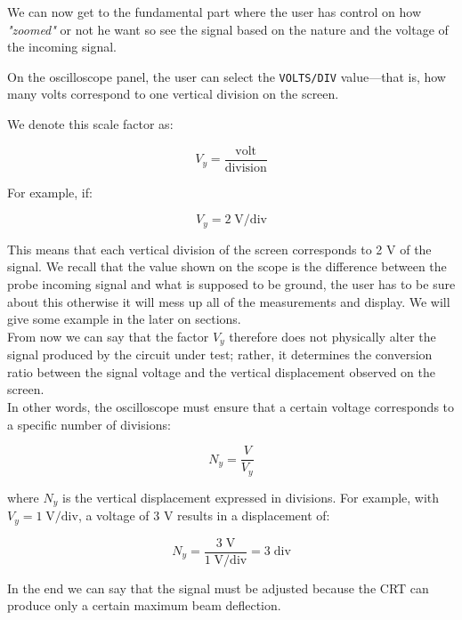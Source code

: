 \documentclass[../main.tex]{subfiles}
\begin{document}
We can now get to the fundamental part where the user has control on how \textit{"zoomed"} or not he want so see the signal based on the nature and the voltage of the incoming signal.

On the oscilloscope panel, the user can select the \texttt{VOLTS/DIV} value—that is, how many volts correspond to one vertical division on the screen.

We denote this scale factor as:

\begin{equation}
	V_y = \frac{\text{volt}}{\text{division}}
\end{equation}

For example, if:

\begin{equation}
	V_y=2 \; \text{V/div}
\end{equation}

This means that each vertical division of the screen corresponds to 2 V of the signal. We recall that the value shown on the scope is the difference between the probe incoming signal and what is supposed to be ground, the user has to be sure about this otherwise it will mess up all of the measurements and display. We will give some example in the later on sections.\\

From now we can say that the factor $V_y$ therefore does not physically alter the signal produced by the circuit under test; rather, it determines the conversion ratio between the signal voltage and the vertical displacement observed on the screen.\\

In other words, the oscilloscope must ensure that a certain voltage corresponds to a specific number of divisions:

\begin{equation}
	N_y=\frac{V}{V_y}
\end{equation}

where $N_y$ is the vertical displacement expressed in divisions. For example, with $V_y = 1 \; \text{V/div}$, a voltage of 3 V results in a displacement of:

\begin{equation}
	N_y=\frac{3 \; \text{V}}{1 \; \text{V/div}}=3 \; \text{div}
\end{equation}

In the end we can say that the signal must be adjusted because the CRT can produce only a certain maximum beam deflection. 
\end{document}
